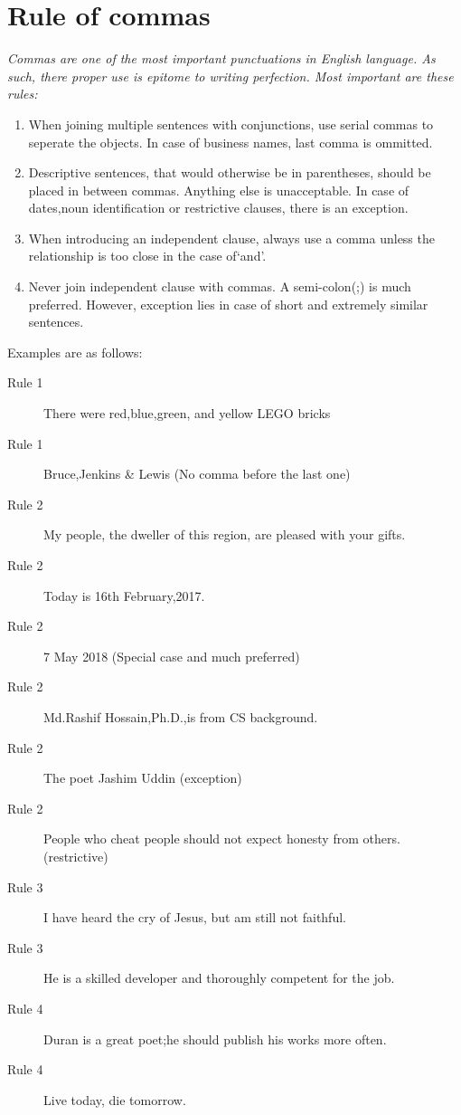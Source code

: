 \documentclass{report}
\begin{document}
\section{Rule of commas}
{
\em
Commas are one of the most important punctuations in English language. As such, there proper use is epitome to writing perfection. Most important are these rules:

\begin{enumerate}
\item When joining multiple sentences with conjunctions, use serial commas to seperate the objects. In case of business names, last comma is ommitted.
\item Descriptive sentences, that would otherwise be in parentheses, should be placed in between commas. Anything else is unacceptable. In case of dates,noun identification or restrictive clauses, there is an exception.
\item When introducing an independent clause, always use a comma unless the relationship is too close in the case of`and'.
\item Never join independent clause with commas. A semi-colon(;) is much preferred. However, exception lies in case of short and extremely similar sentences.
\end{enumerate}
Examples are as follows:
\begin{description}
\item[Rule 1] There were red,blue,green, and yellow LEGO bricks
\item[Rule 1] Bruce,Jenkins \& Lewis (No comma before the last one)
\item[Rule 2] My people, the dweller of this region, are pleased with your gifts.
\item[Rule 2] Today is 16th February,2017.
\item[Rule 2] 7 May 2018 (Special case and much preferred)
\item[Rule 2] Md.Rashif Hossain,Ph.D.,is from CS background.
\item[Rule 2] The poet Jashim Uddin (exception)
\item[Rule 2] People who cheat people should not expect honesty from others. (restrictive)
\item[Rule 3] I have heard the cry of Jesus, but am still not faithful.
\item[Rule 3] He is a skilled developer and thoroughly competent for the job.
\item[Rule 4] Duran is a great poet;he should publish his works more often.
\item[Rule 4] Live today, die tomorrow.
\end{description}
}
\end{document}
